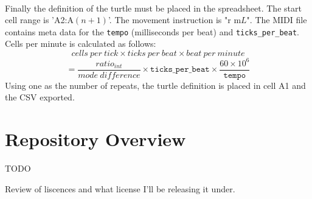 \paragraph{} Finally the definition of the turtle must be placed in the spreadsheet. The start cell range is 'A2:A$(n+1)$'. The movement instruction is "r m$L$". The MIDI file contains meta data for the \texttt{tempo} (milliseconds per beat) and \texttt{ticks\_per\_beat}. Cells per minute is calculated as follows:
  $$cells\ per\ tick \times ticks\ per\ beat \times beat\ per\ minute$$
  $$= \frac{ratio_{int}}{mode\ difference} \times \texttt{ticks\_per\_beat} \times \frac{60 \times 10^6}{\texttt{tempo}}$$
Using one as the number of repeats, the turtle definition is placed in cell A1 and the CSV exported.

\section{Repository Overview}

TODO

Review of liscences and what license I'll be releasing it under.

